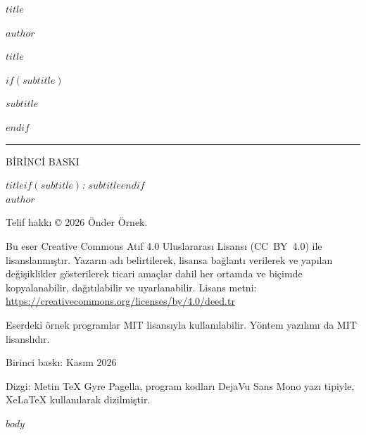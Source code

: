 \documentclass[10.5pt,twoside,openright]{memoir}
\begin{document}
\frontmatter
\thispagestyle{empty}
\vspace*{0.28\textheight}
\begin{center}\LARGE\itshape $title$\end{center}
\cleardoublepage
\thispagestyle{empty}
\begin{center}
\vspace*{0.06\textheight}
{\large{\aralikli \MakeUppercase{$author$}}\par}
\vspace{0.2\textheight}
{\fontsize{27}{33}\selectfont $title$\par}
$if(subtitle)$
\vspace{1.1\baselineskip}
{\Large\itshape $subtitle$\par}
$endif$
\vspace{1.4\baselineskip}
{\color{cizgi}\rule{3cm}{0.5pt}\par}
\vfill
{\small{\aralikli BİRİNCİ BASKI}\par\vspace{0.3\baselineskip}\small{}\par}
\end{center}
\newpage
\thispagestyle{empty}
\vspace*{\fill}
{\footnotesize\setlength{\parindent}{0pt}\setlength{\parskip}{0.55\baselineskip}\raggedright
\textit{$title$$if(subtitle)$: $subtitle$$endif$}\\
$author$

Telif hakkı {\duzrakam © 2026} Önder Örnek.

Bu eser Creative Commons Atıf 4.0 Uluslararası Lisansı (CC~BY~4.0) ile lisanslanmıştır. Yazarın adı belirtilerek, lisansa bağlantı verilerek ve yapılan değişiklikler gösterilerek ticari amaçlar dahil her ortamda ve biçimde kopyalanabilir, dağıtılabilir ve uyarlanabilir. Lisans metni: \url{https://creativecommons.org/licenses/by/4.0/deed.tr}

Eserdeki örnek programlar MIT lisansıyla kullanılabilir. Yöntem yazılımı da MIT lisanslıdır.

Birinci baskı: {\duzrakam Kasım 2026}

Dizgi: Metin TeX Gyre Pagella, program kodları DejaVu Sans Mono yazı tipiyle, XeLaTeX kullanılarak dizilmiştir.\par}
\cleardoublepage
\tableofcontents*
\cleardoublepage
$body$
\end{document}
